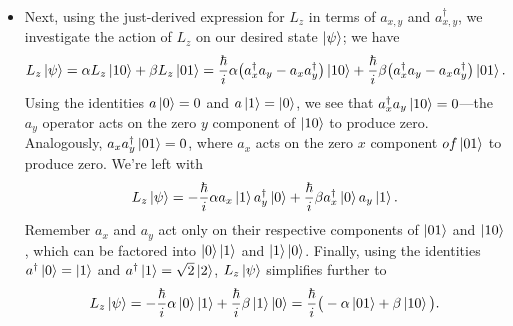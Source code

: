 \documentclass[11pt, a4paper]{article}
\begin{document}
\begin{itemize}
	\item Next, using the just-derived expression for $ L_{z} $ in terms of $ a_{x,y} $ and $ a_{x,y}^{\dagger} $, we investigate the action of $ L_{z} $ on our desired state $ \ket{\psi} $; we have
	\begin{equation*}
		L_{z}\ket{\psi} = \alpha L_{z}\ket{10} + \beta L_{z} \ket{01} =  \frac{\hbar}{i}\alpha\big(a_{x}^{\dagger}a_{y} - a_{x}a_{y}^{\dagger}\big)\ket{10} +  \frac{\hbar}{i}\beta\big(a_{x}^{\dagger}a_{y} - a_{x}a_{y}^{\dagger}\big)\ket{01}.
	\end{equation*}
	Using the identities $ a\ket{0} = 0 $ and $ a\ket{1} = \ket{0} $, we see that $ a_{x}^{\dagger}a_{y} \ket{10} = 0 $---the $ a_{y} $ operator acts on the zero $ y $ component of $ \ket{10} $ to produce zero. Analogously, $ a_{x}a_{y}^{\dagger} \ket{01} = 0 $, where $ a_{x} $ acts on the zero $ x $ component $ of \ket{01} $ to produce zero. We're left with
	\begin{equation*}
		L_{z}\ket{\psi} = -\frac{\hbar}{i}\alpha a_{x}\ket{1}a_{y}^{\dagger}\ket{0} + \frac{\hbar}{i}\beta a_{x}^{\dagger}\ket{0}a_{y}\ket{1}.
	\end{equation*}
	Remember $ a_{x} $ and $ a_{y} $ act only on their respective components of $ \ket{01} $ and $ \ket{10} $, which can be factored into $ \ket{0}\ket{1} $ and $ \ket{1}\ket{0} $. Finally, using the identities $ a^{\dagger}\ket{0} = \ket{1} $ and $ a^{\dagger}\ket{1} = \sqrt{2}\ket{2} $, $ L_{z}\ket{\psi} $ simplifies further to
	\begin{equation*}
		L_{z}\ket{\psi} = -\frac{\hbar}{i}\alpha\ket{0}\ket{1} + \frac{\hbar}{i}\beta \ket{1}\ket{0} = \frac{\hbar}{i}\big(-\alpha \ket{01} + \beta \ket{10}\big).
	\end{equation*}
	

\end{itemize}
\end{document}
